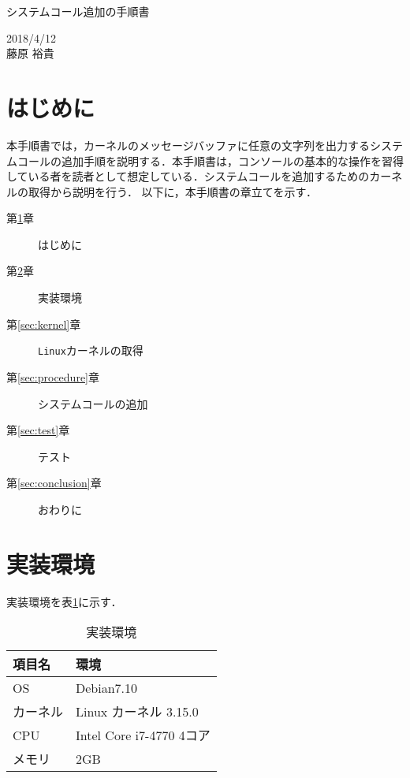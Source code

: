 \documentclass[12pt]{jsarticle}
\begin{document}
\begin{center}
{\LARGE システムコール追加の手順書}
\end{center}

\begin{flushright}
  2018/4/12\\
 藤原 裕貴
\end{flushright}
\section{はじめに}\label{sec:introduction}
本手順書では，カーネルのメッセージバッファに任意の文字列を出力するシステムコールの追加手順を説明する．本手順書は，コンソールの基本的な操作を習得している者を読者として想定している．システムコールを追加するためのカーネルの取得から説明を行う．
以下に，本手順書の章立てを示す．

\begin{description}
\item [第\ref{sec:introduction}章] はじめに
\item [第\ref{sec:env}章] 実装環境
\item [第\ref{sec:kernel}章] \verb|Linux|カーネルの取得
\item [第\ref{sec:procedure}章] システムコールの追加
\item [第\ref{sec:test}章] テスト
\item [第\ref{sec:conclusion}章] おわりに



\end{description}

\section{実装環境}\label{sec:env}
実装環境を表\ref{tab:env}に示す．

\begin{table}[h]
  \begin{center}
    \caption{実装環境}\label{tab:env}
    \begin{tabular}{l|l}
      \hline\hline
      \multicolumn{1}{l|}{項目名} & \multicolumn{1}{l}{環境} \\
      \hline
      OS & Debian7.10 \\
      カーネル & Linux カーネル 3.15.0 \\
      CPU & Intel Core i7-4770 4コア\\
      メモリ & 2GB \\
      \hline
    \end{tabular}
  \end{center}
\end{table}
\end{document}
